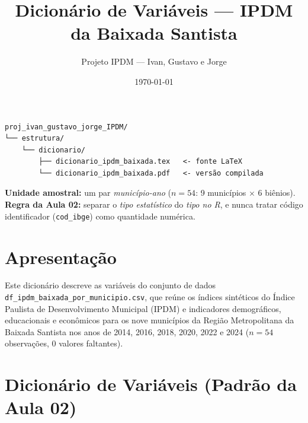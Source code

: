 \documentclass[11pt,a4paper]{article}
\title{Dicionário de Variáveis --- IPDM da Baixada Santista}
\author{Projeto IPDM --- Ivan, Gustavo e Jorge}
\date{\today}
\begin{document}
\maketitle
\begin{tcolorbox}[
  colback=blue!5!white,
  colframe=blue!60!black,
  coltitle=white,
  title=Localização deste arquivo e papel na Aula 02,
  fonttitle=\bfseries,
  boxrule=1pt,
  arc=3pt,
  left=6pt, right=6pt, top=6pt, bottom=6pt
]
\begin{verbatim}
proj_ivan_gustavo_jorge_IPDM/
└── estrutura/
    └── dicionario/
        ├── dicionario_ipdm_baixada.tex   <- fonte LaTeX
        └── dicionario_ipdm_baixada.pdf   <- versão compilada
\end{verbatim}
\small\textbf{Unidade amostral:} um par \emph{município-ano} ($n = 54$: 9 municípios $\times$ 6 biênios).\\
\textbf{Regra da Aula 02:} separar o \emph{tipo estatístico} do \emph{tipo no R}, e nunca tratar código identificador (\texttt{cod\_ibge}) como quantidade numérica.
\end{tcolorbox}

\section*{Apresentação}
Este dicionário descreve as variáveis do conjunto de dados \texttt{df\_ipdm\_baixada\_por\_municipio.csv}, que reúne os índices sintéticos do Índice Paulista de Desenvolvimento Municipal (IPDM) e indicadores demográficos, educacionais e econômicos para os nove municípios da Região Metropolitana da Baixada Santista nos anos de 2014, 2016, 2018, 2020, 2022 e 2024 ($n = 54$ observações, $0$ valores faltantes).

\section*{Dicionário de Variáveis (Padrão da Aula 02)}
\end{document}
